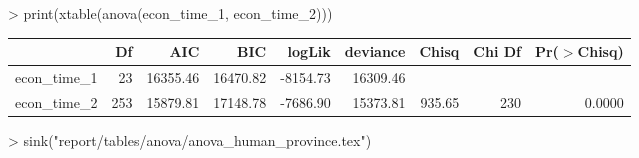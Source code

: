 
>   print(xtable(anova(econ_time_1, econ_time_2)))
\begin{table}[ht]
\centering
\begin{tabular}{lrrrrrrrr}
  \hline
 & Df & AIC & BIC & logLik & deviance & Chisq & Chi Df & Pr($>$Chisq) \\ 
  \hline
econ\_time\_1 & 23 & 16355.46 & 16470.82 & -8154.73 & 16309.46 &  &  &  \\ 
  econ\_time\_2 & 253 & 15879.81 & 17148.78 & -7686.90 & 15373.81 & 935.65 & 230 & 0.0000 \\ 
   \hline
\end{tabular}
\end{table}

>   sink("report/tables/anova/anova_human_province.tex")
